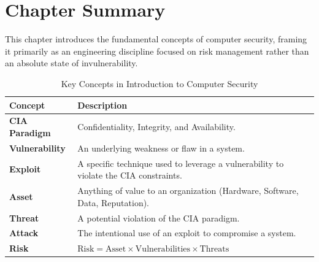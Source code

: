 \section*{Chapter Summary}

This chapter introduces the fundamental concepts of computer security, framing it primarily as an engineering discipline focused on risk management rather than an absolute state of invulnerability.

\begin{table}[htpb]
    \centering
    \renewcommand{\arraystretch}{1.3}
    \begin{tabular}{|l|p{10cm}|}
        \hline
        \textbf{Concept} & \textbf{Description} \\ \hline
        \textbf{CIA Paradigm} & Confidentiality, Integrity, and Availability. \\ \hline
        \textbf{Vulnerability} & An underlying weakness or flaw in a system. \\ \hline
        \textbf{Exploit} & A specific technique used to leverage a vulnerability to violate the CIA constraints. \\ \hline
        \textbf{Asset} & Anything of value to an organization (Hardware, Software, Data, Reputation). \\ \hline
        \textbf{Threat} & A potential violation of the CIA paradigm. \\ \hline
        \textbf{Attack} & The intentional use of an exploit to compromise a system. \\ \hline
        \textbf{Risk} & $\text{Risk} = \text{Asset} \times \text{Vulnerabilities} \times \text{Threats}$ \\ \hline
    \end{tabular}
    \caption{Key Concepts in Introduction to Computer Security}
    \label{tab:ch01_concepts}
\end{table}
